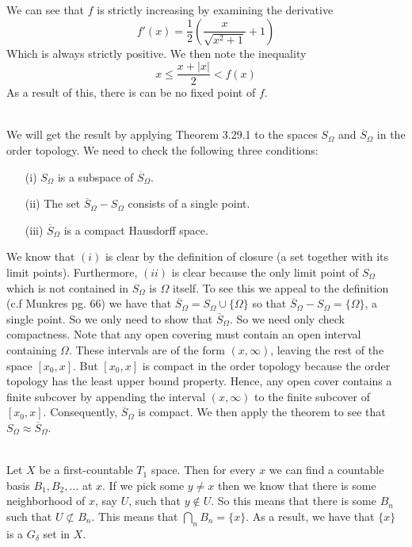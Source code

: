 \documentclass{article}
\newcommand{\problem}[1]{\noindent{\textbf{Problem #1}}\\}
\newcommand{\problempart}[1]{\noindent{\textbf{(#1)}}}
\begin{document}
We can see that $f$ is strictly increasing by examining the derivative
\[
f'(x) = \frac{1}{2}\left(\frac{x}{\sqrt{x^2+1}} + 1\right)
\]
Which is always strictly positive. We then note the inequality
\[
x \leq \frac{x + |x|}{2} < f(x)
\]
As a result of this, there is can be no fixed point of $f$. 

\problem{3.29.7} We will get the result by applying Theorem 3.29.1 to the spaces $S_\Omega$ and $\overline{S}_\Omega$ in the order topology. We need to check the following three conditions:
\begin{enumerate}
\item[(i)] $S_\Omega$ is a subspace of $\overline{S}_\Omega$.
\item[(ii)] The set $\overline{S}_\Omega - S_\Omega$ consists of a single point.
\item[(iii)] $\overline{S}_\Omega$ is a compact Hausdorff space.
\end{enumerate}
We know that $(i)$ is clear by the definition of closure (a set together with its limit points). Furthermore, $(ii)$ is clear because the only limit point of $S_\Omega$ which is not contained in $S_\Omega$ is $\Omega$ itself. To see this we appeal to the definition (c.f Munkres pg. 66) we have that $\overline{S}_\Omega = S_\Omega \cup \{\Omega\}$ so that $\overline{S}_\Omega - S_\Omega = \{\Omega\}$, a single point. So we only need to show that $\overline{S}_\Omega$. So we need only check compactness. Note that any open covering must contain an open interval containing $\Omega$. These intervals are of the form $(x, \infty)$, leaving the rest of the space $[x_0, x]$. But $[x_0, x]$ is compact in the order topology because the order topology has the least upper bound property. Hence, any open cover contains a finite subcover by appending the interval $(x, \infty)$ to the finite subcover of $[x_0,x]$. Consequently, $\overline{S}_\Omega$ is compact. We then apply the theorem to see that $S_\Omega \approx \overline{S}_\Omega$. 
  
\problem{4.30.1}
\problempart{a} Let $X$ be a first-countable $T_1$ space. Then for every $x$ we can find a countable basis $B_1, B_2, \ldots$ at $x$. If we pick some $y \neq x$ then we know that there is some neighborhood of $x$, say $U$, such that $y \not\in U$. So this means that there is some $B_n$ such that $U \not\subset B_n$. This means that $\bigcap_n B_n = \{x\}$. As  a result, we have that $\{x\}$ is a $G_\delta$ set in $X$.  
\end{document}
